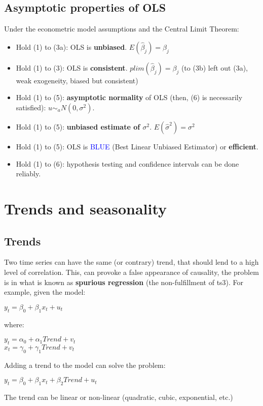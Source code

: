 \documentclass[10pt, a4paper, landscape]{extarticle}
\begin{document}
\begin{multicols}{3}
	\subsection*{Asymptotic properties of OLS}
		Under the econometric model assumptions and the Central Limit Theorem:
		\begin{itemize}[leftmargin=*]
			\item Hold (1) to (3a): OLS is \textbf{unbiased}. $E(\hat{\beta}_j) = \beta_j$
			\item Hold (1) to (3): OLS is \textbf{consistent}. $plim(\hat{\beta}_j) = \beta_j$ (to (3b) left out (3a), weak exogeneity, biased but consistent)
			\item Hold (1) to (5): \textbf{asymptotic normality} of OLS (then, (6) is necessarily satisfied): $u \sim_a N(0,\sigma^2)$.
			\item Hold (1) to (5): \textbf{unbiased estimate of $\sigma^2$}. $E(\hat{\sigma}^2) = \sigma^2$
			\item Hold (1) to (5): OLS is \textcolor{blue}{BLUE} (Best Linear Unbiased Estimator) or \textbf{efficient}. 
			\item Hold (1) to (6): hypothesis testing and confidence intervals can be done reliably.
		\end{itemize}

\section*{Trends and seasonality}
	\subsection*{Trends}
		Two time series can have the same (or contrary) trend, that should lend to a high level of correlation. This, can provoke a false appearance of causality, the problem is in what is known as \textbf{spurious regression} (the non-fulfillment of ts3). For example, given the model:
		\begin{center}
			$y_t = \beta_0 + \beta_1 x_t + u_t$
		\end{center}
		where:
		\begin{center}
			$y_t = \alpha_0 + \alpha_1 Trend + v_t$
			\\ $x_t = \gamma_0 + \gamma_1 Trend + v_t$
		\end{center}
		Adding a trend to the model can solve the problem:
		\begin{center}
			$y_t = \beta_0 + \beta_1 x_t + \beta_2 Trend + u_t$
		\end{center}
		The trend can be linear or non-linear (quadratic, cubic, exponential, etc.)

\end{multicols}
\end{document}
